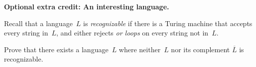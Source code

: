 \documentclass[11pt,addpoints]{exam}
\begin{document}
\begin{questions}
\begin{parts}
    \begin{solution}
      
    \end{solution}
  \end{parts}
  
  \bonusquestion[5] \textbf{Optional extra credit: An interesting language.}

  Recall that a language~$L$ is \emph{recognizable} if there is a Turing machine that accepts every string in~$L$, and either rejects \emph{or loops} on every string not in~$L$.

  Prove that there exists a language~$L$ where neither~$L$ nor its complement $\overline{L}$ is recognizable.

  \begin{solution}
    
  \end{solution}
  
\end{questions}
\end{document}
